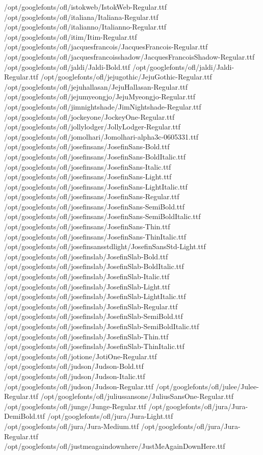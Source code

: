 /opt/googlefonts/ofl/istokweb/IstokWeb-Regular.ttf
/opt/googlefonts/ofl/italiana/Italiana-Regular.ttf
/opt/googlefonts/ofl/italianno/Italianno-Regular.ttf
/opt/googlefonts/ofl/itim/Itim-Regular.ttf
/opt/googlefonts/ofl/jacquesfrancois/JacquesFrancois-Regular.ttf
/opt/googlefonts/ofl/jacquesfrancoisshadow/JacquesFrancoisShadow-Regular.ttf
/opt/googlefonts/ofl/jaldi/Jaldi-Bold.ttf
/opt/googlefonts/ofl/jaldi/Jaldi-Regular.ttf
/opt/googlefonts/ofl/jejugothic/JejuGothic-Regular.ttf
/opt/googlefonts/ofl/jejuhallasan/JejuHallasan-Regular.ttf
/opt/googlefonts/ofl/jejumyeongjo/JejuMyeongjo-Regular.ttf
/opt/googlefonts/ofl/jimnightshade/JimNightshade-Regular.ttf
/opt/googlefonts/ofl/jockeyone/JockeyOne-Regular.ttf
/opt/googlefonts/ofl/jollylodger/JollyLodger-Regular.ttf
/opt/googlefonts/ofl/jomolhari/Jomolhari-alpha3c-0605331.ttf
/opt/googlefonts/ofl/josefinsans/JosefinSans-Bold.ttf
/opt/googlefonts/ofl/josefinsans/JosefinSans-BoldItalic.ttf
/opt/googlefonts/ofl/josefinsans/JosefinSans-Italic.ttf
/opt/googlefonts/ofl/josefinsans/JosefinSans-Light.ttf
/opt/googlefonts/ofl/josefinsans/JosefinSans-LightItalic.ttf
/opt/googlefonts/ofl/josefinsans/JosefinSans-Regular.ttf
/opt/googlefonts/ofl/josefinsans/JosefinSans-SemiBold.ttf
/opt/googlefonts/ofl/josefinsans/JosefinSans-SemiBoldItalic.ttf
/opt/googlefonts/ofl/josefinsans/JosefinSans-Thin.ttf
/opt/googlefonts/ofl/josefinsans/JosefinSans-ThinItalic.ttf
/opt/googlefonts/ofl/josefinsansstdlight/JosefinSansStd-Light.ttf
/opt/googlefonts/ofl/josefinslab/JosefinSlab-Bold.ttf
/opt/googlefonts/ofl/josefinslab/JosefinSlab-BoldItalic.ttf
/opt/googlefonts/ofl/josefinslab/JosefinSlab-Italic.ttf
/opt/googlefonts/ofl/josefinslab/JosefinSlab-Light.ttf
/opt/googlefonts/ofl/josefinslab/JosefinSlab-LightItalic.ttf
/opt/googlefonts/ofl/josefinslab/JosefinSlab-Regular.ttf
/opt/googlefonts/ofl/josefinslab/JosefinSlab-SemiBold.ttf
/opt/googlefonts/ofl/josefinslab/JosefinSlab-SemiBoldItalic.ttf
/opt/googlefonts/ofl/josefinslab/JosefinSlab-Thin.ttf
/opt/googlefonts/ofl/josefinslab/JosefinSlab-ThinItalic.ttf
/opt/googlefonts/ofl/jotione/JotiOne-Regular.ttf
/opt/googlefonts/ofl/judson/Judson-Bold.ttf
/opt/googlefonts/ofl/judson/Judson-Italic.ttf
/opt/googlefonts/ofl/judson/Judson-Regular.ttf
/opt/googlefonts/ofl/julee/Julee-Regular.ttf
/opt/googlefonts/ofl/juliussansone/JuliusSansOne-Regular.ttf
/opt/googlefonts/ofl/junge/Junge-Regular.ttf
/opt/googlefonts/ofl/jura/Jura-DemiBold.ttf
/opt/googlefonts/ofl/jura/Jura-Light.ttf
/opt/googlefonts/ofl/jura/Jura-Medium.ttf
/opt/googlefonts/ofl/jura/Jura-Regular.ttf
/opt/googlefonts/ofl/justmeagaindownhere/JustMeAgainDownHere.ttf
